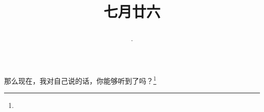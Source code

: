 \title{\date[d=29,m=8,y=2024][year:cn-y,年,month:cn,day:cn,日,·,weekday]·七月廿六 }
那么现在，我对自己说的话，你能够听到了吗？\footnote{ }

